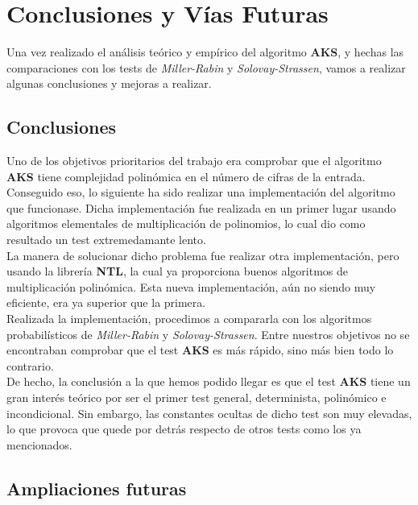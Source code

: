 \chapter{Conclusiones y Vías Futuras}

Una vez realizado el análisis teórico y empírico del algoritmo \textbf{AKS}, y hechas las comparaciones con los tests de \textit{Miller-Rabin} y \textit{Solovay-Strassen}, vamos a realizar algunas conclusiones y mejoras a realizar.

\section{Conclusiones}

Uno de los objetivos prioritarios del trabajo era comprobar que el algoritmo \textbf{AKS} tiene complejidad polinómica en el número de cifras de la entrada.\\

Conseguido eso, lo siguiente ha sido realizar una implementación del algoritmo que funcionase. Dicha implementación fue realizada en un primer lugar usando algoritmos elementales de multiplicación de polinomios, lo cual dio como resultado un test extremedamante lento.\\

La manera de solucionar dicho problema fue realizar otra implementación, pero usando la librería \textbf{NTL}, la cual ya proporciona buenos algoritmos de multiplicación polinómica. Esta nueva implementación, aún no siendo muy eficiente, era ya superior que la primera.\\

Realizada la implementación, procedimos a compararla con los algoritmos probabilísticos de \textit{Miller-Rabin} y \textit{Solovay-Strassen}. Entre nuestros objetivos no se encontraban comprobar que el test \textbf{AKS} es más rápido, sino más bien todo lo contrario.\\

De hecho, la conclusión a la que hemos podido llegar es que el test \textbf{AKS} tiene un gran interés teórico por ser el primer test general, determinista, polinómico e incondicional. Sin embargo, las constantes ocultas de dicho test son muy elevadas, lo que provoca que quede por detrás respecto de otros tests como los ya mencionados.

\section{Ampliaciones futuras}

